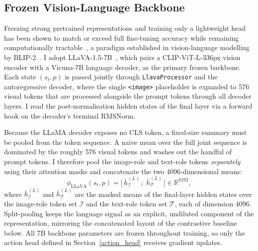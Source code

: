 \subsection{Frozen Vision-Language Backbone} \label{sec:backbone}
Freezing strong pretrained representations and training only a lightweight
head has been shown to match or exceed full fine-tuning accuracy while
remaining computationally
tractable~\cite{kumar2022finetuningdistortpretrainedfeatures}, a paradigm
established in vision-language modelling by
BLIP-2~\cite{li2023blip2bootstrappinglanguageimagepretraining}. I adopt
LLaVA-1.5-7B~\cite{liu2024improvedbaselinesvisualinstruction}, which pairs a
CLIP-ViT-L-336px vision encoder with a Vicuna-7B language decoder, as the
primary frozen backbone. Each state $(s_t, p)$ is passed jointly through
\texttt{LlavaProcessor} and the autoregressive decoder, where the single
\texttt{<image>} placeholder is expanded to 576 visual tokens that are
processed alongside the prompt tokens through all decoder layers. I read the
post-normalisation hidden states of the final layer via a forward hook on the
decoder's terminal RMSNorm.

Because the LLaMA decoder exposes no CLS token, a fixed-size summary must be
pooled from the token sequence. A naive mean over the full joint sequence is
dominated by the roughly 576 visual tokens and washes out the handful of
prompt tokens. I therefore pool the image-role and text-role tokens
\emph{separately} using their attention masks and concatenate the two
4096-dimensional means:
\begin{equation}
    \phi_{\mathrm{LLaVA}}(s_t, p) = \bigl[\, \overline{h}^{(L)}_{\mathcal{I}}\,;\;
    \overline{h}^{(L)}_{\mathcal{T}} \,\bigr] \in \mathbb{R}^{8192},
\end{equation}
where $\overline{h}^{(L)}_{\mathcal{I}}$ and $\overline{h}^{(L)}_{\mathcal{T}}$
are the masked means of the final-layer hidden states over the image-role
token set $\mathcal{I}$ and the text-role token set $\mathcal{T}$, each of
dimension 4096. Split-pooling keeps the language signal as an explicit,
undiluted component of the representation, mirroring the concatenated layout
of the contrastive baseline below. All 7B backbone parameters are frozen
throughout training, so only the action head defined in
Section~\ref{action_head} receives gradient updates.

